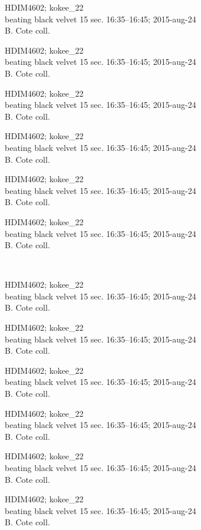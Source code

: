 \documentclass[2pt]{extarticle}
\begin{document}
\noindent
\parbox{0.16\textwidth}{\tiny \raggedright \rule[-0.3\baselineskip]{0pt}{10pt}HDIM4602; kokee\_22\\ beating black velvet 15 sec. 16:35--16:45; 2015-aug-24\\ B. Cote coll.}
\parbox{0.16\textwidth}{\tiny \raggedright \rule[-0.3\baselineskip]{0pt}{10pt}HDIM4602; kokee\_22\\ beating black velvet 15 sec. 16:35--16:45; 2015-aug-24\\ B. Cote coll.}
\parbox{0.16\textwidth}{\tiny \raggedright \rule[-0.3\baselineskip]{0pt}{10pt}HDIM4602; kokee\_22\\ beating black velvet 15 sec. 16:35--16:45; 2015-aug-24\\ B. Cote coll.}
\parbox{0.16\textwidth}{\tiny \raggedright \rule[-0.3\baselineskip]{0pt}{10pt}HDIM4602; kokee\_22\\ beating black velvet 15 sec. 16:35--16:45; 2015-aug-24\\ B. Cote coll.}
\parbox{0.16\textwidth}{\tiny \raggedright \rule[-0.3\baselineskip]{0pt}{10pt}HDIM4602; kokee\_22\\ beating black velvet 15 sec. 16:35--16:45; 2015-aug-24\\ B. Cote coll.}
\parbox{0.16\textwidth}{\tiny \raggedright \rule[-0.3\baselineskip]{0pt}{10pt}HDIM4602; kokee\_22\\ beating black velvet 15 sec. 16:35--16:45; 2015-aug-24\\ B. Cote coll.} \\ 
\vspace{0.001in} 

\noindent
\parbox{0.16\textwidth}{\tiny \raggedright \rule[-0.3\baselineskip]{0pt}{10pt}HDIM4602; kokee\_22\\ beating black velvet 15 sec. 16:35--16:45; 2015-aug-24\\ B. Cote coll.}
\parbox{0.16\textwidth}{\tiny \raggedright \rule[-0.3\baselineskip]{0pt}{10pt}HDIM4602; kokee\_22\\ beating black velvet 15 sec. 16:35--16:45; 2015-aug-24\\ B. Cote coll.}
\parbox{0.16\textwidth}{\tiny \raggedright \rule[-0.3\baselineskip]{0pt}{10pt}HDIM4602; kokee\_22\\ beating black velvet 15 sec. 16:35--16:45; 2015-aug-24\\ B. Cote coll.}
\parbox{0.16\textwidth}{\tiny \raggedright \rule[-0.3\baselineskip]{0pt}{10pt}HDIM4602; kokee\_22\\ beating black velvet 15 sec. 16:35--16:45; 2015-aug-24\\ B. Cote coll.}
\parbox{0.16\textwidth}{\tiny \raggedright \rule[-0.3\baselineskip]{0pt}{10pt}HDIM4602; kokee\_22\\ beating black velvet 15 sec. 16:35--16:45; 2015-aug-24\\ B. Cote coll.}
\parbox{0.16\textwidth}{\tiny \raggedright \rule[-0.3\baselineskip]{0pt}{10pt}HDIM4602; kokee\_22\\ beating black velvet 15 sec. 16:35--16:45; 2015-aug-24\\ B. Cote coll.} \\ 
\vspace{0.001in} 
\end{document}
